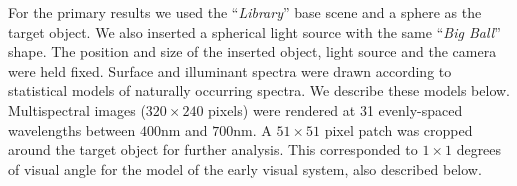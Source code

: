\documentclass{jov}
\begin{document}

For the primary results we used the ``{\it Library}'' base scene and a sphere as the target object. We also inserted a spherical light source with the same ``{\it Big Ball}'' shape. The position and size of the inserted object, light source and the camera were held fixed. Surface and illuminant spectra were drawn according to statistical models of naturally occurring spectra. We describe these models below. Multispectral images ($320 \times 240$ pixels) were rendered at 31 evenly-spaced wavelengths between $400$nm and $700$nm. A $51 \times 51$ pixel patch was cropped around the target object for further analysis. This corresponded to $1 \times 1$ degrees of visual angle for the model of the early visual system, also described below.

\end{document}
